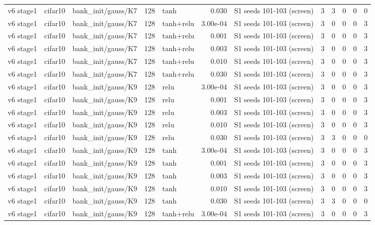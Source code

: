 \begin{table}[htbp]
{\begin{tabular}{@{}lllrlrlrrrrr@{}}
v6 stage1 & cifar10 & bank\_init/gauss/K7 & 128 & tanh & 0.030 & S1 seeds 101-103 (screen) & 3 & 3 & 0 & 0 & 0 \\
v6 stage1 & cifar10 & bank\_init/gauss/K7 & 128 & tanh+relu & 3.00e-04 & S1 seeds 101-103 (screen) & 3 & 0 & 0 & 0 & 3 \\
v6 stage1 & cifar10 & bank\_init/gauss/K7 & 128 & tanh+relu & 0.001 & S1 seeds 101-103 (screen) & 3 & 0 & 0 & 0 & 3 \\
v6 stage1 & cifar10 & bank\_init/gauss/K7 & 128 & tanh+relu & 0.003 & S1 seeds 101-103 (screen) & 3 & 0 & 0 & 0 & 3 \\
v6 stage1 & cifar10 & bank\_init/gauss/K7 & 128 & tanh+relu & 0.010 & S1 seeds 101-103 (screen) & 3 & 0 & 0 & 0 & 3 \\
v6 stage1 & cifar10 & bank\_init/gauss/K7 & 128 & tanh+relu & 0.030 & S1 seeds 101-103 (screen) & 3 & 0 & 0 & 0 & 3 \\
v6 stage1 & cifar10 & bank\_init/gauss/K9 & 128 & relu & 3.00e-04 & S1 seeds 101-103 (screen) & 3 & 0 & 0 & 0 & 3 \\
v6 stage1 & cifar10 & bank\_init/gauss/K9 & 128 & relu & 0.001 & S1 seeds 101-103 (screen) & 3 & 0 & 0 & 0 & 3 \\
v6 stage1 & cifar10 & bank\_init/gauss/K9 & 128 & relu & 0.003 & S1 seeds 101-103 (screen) & 3 & 0 & 0 & 0 & 3 \\
v6 stage1 & cifar10 & bank\_init/gauss/K9 & 128 & relu & 0.010 & S1 seeds 101-103 (screen) & 3 & 0 & 0 & 0 & 3 \\
v6 stage1 & cifar10 & bank\_init/gauss/K9 & 128 & relu & 0.030 & S1 seeds 101-103 (screen) & 3 & 3 & 0 & 0 & 0 \\
v6 stage1 & cifar10 & bank\_init/gauss/K9 & 128 & tanh & 3.00e-04 & S1 seeds 101-103 (screen) & 3 & 0 & 0 & 0 & 3 \\
v6 stage1 & cifar10 & bank\_init/gauss/K9 & 128 & tanh & 0.001 & S1 seeds 101-103 (screen) & 3 & 0 & 0 & 0 & 3 \\
v6 stage1 & cifar10 & bank\_init/gauss/K9 & 128 & tanh & 0.003 & S1 seeds 101-103 (screen) & 3 & 0 & 0 & 0 & 3 \\
v6 stage1 & cifar10 & bank\_init/gauss/K9 & 128 & tanh & 0.010 & S1 seeds 101-103 (screen) & 3 & 0 & 0 & 0 & 3 \\
v6 stage1 & cifar10 & bank\_init/gauss/K9 & 128 & tanh & 0.030 & S1 seeds 101-103 (screen) & 3 & 3 & 0 & 0 & 0 \\
v6 stage1 & cifar10 & bank\_init/gauss/K9 & 128 & tanh+relu & 3.00e-04 & S1 seeds 101-103 (screen) & 3 & 0 & 0 & 0 & 3 \\

\end{tabular}}
\end{table}
